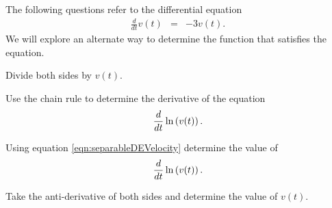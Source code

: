 \begin{problem}
\item The following questions refer to the differential equation
  \begin{eqnarray}
    \label{eqn:separableDEVelocity}
    \frac{d}{dt} v(t) & = & -3 v(t).
  \end{eqnarray}
  We will explore an alternate way to determine the function that satisfies the equation.
  \begin{subproblem}
  \item Divide both sides by $v(t)$.
    \vfill
  \item Use the chain rule to determine the derivative of the equation
    \begin{eqnarray*}
      \frac{d}{dt} \ln\left( v(t) \right).
    \end{eqnarray*}
    \vfill
  \item Using equation \ref{eqn:separableDEVelocity} determine the
    value of
    \begin{eqnarray*}
      \frac{d}{dt} \ln\left( v(t) \right).
    \end{eqnarray*}
    \vfill
  \item Take the anti-derivative of both sides and determine the value
    of $v(t)$.
    \vfill
  \end{subproblem}

\end{problem}

\postClass

